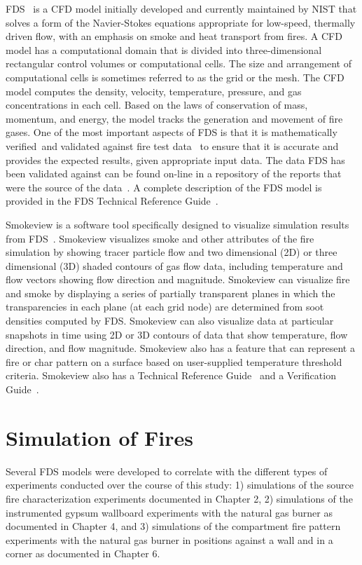 \documentclass[twoside]{uocthesis}
\begin{document}
{FDS~\cite{FDS_Users_Guide} is a CFD model initially developed and currently maintained by NIST that solves a form of the Navier-Stokes equations appropriate for low-speed, thermally driven flow, with an emphasis on smoke and heat transport from fires. A CFD model has a computational domain that is divided into  three-dimensional rectangular control volumes or computational cells. The size and arrangement of computational cells is sometimes referred to as the grid or the mesh.  The CFD model computes the density, velocity, temperature, pressure, and gas concentrations in each cell. Based on the laws of conservation of mass, momentum, and energy, the model tracks the generation and movement of fire gases. One of the most important aspects of FDS is that it is mathematically verified~\cite{FDS_Verification_Guide}and validated against fire test data~\cite{FDS_Validation_Guide} to ensure that it is accurate and provides the expected results, given appropriate input data.  The data FDS has been validated against can be found on-line in a repository of the reports that were the source of the data~\cite{FDS-SMV_repository}. A complete description of the FDS model is provided in the FDS Technical Reference Guide~\cite{FDS_Tech_Guide}.  

Smokeview is a software tool specifically designed to visualize simulation results from FDS~\cite{Smokeview_Users_Guide}. Smokeview visualizes smoke and other attributes of the fire simulation by showing tracer particle flow and two dimensional (2D) or three dimensional (3D) shaded contours of gas flow data, including temperature and flow vectors showing flow direction and magnitude. Smokeview can visualize fire and smoke by displaying a series of partially transparent planes in which the transparencies in each plane (at each grid node) are determined from soot densities computed by FDS. Smokeview can also visualize data at particular snapshots in time using 2D or 3D contours of data that show temperature, flow direction, and flow magnitude.  Smokeview also has a feature that can represent a fire or char pattern on a surface based on user-supplied temperature threshold criteria.  Smokeview also has a Technical Reference Guide~\cite{Smokeview_Tech_Guide} and a Verification Guide~\cite{Smokeview_Verification_Guide}.

\section{Simulation of Fires}

Several FDS models were developed to correlate with the different types of experiments conducted over the course of this study: 1) simulations of the source fire characterization experiments documented in Chapter 2, 2) simulations of the instrumented gypsum wallboard experiments with the natural gas burner as documented in Chapter 4, and 3) simulations of the compartment fire pattern experiments with the natural gas burner in positions against a wall and in a corner as documented in Chapter 6.  

}
\end{document}
